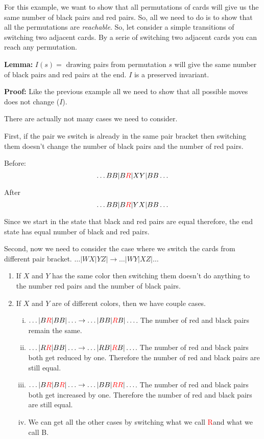 \documentclass[a4paper, 12pt]{article}
\renewcommand{\proof}{\vspace{0.5em}\noindent\textbf{Proof:} }
\newcommand{\lemma}{\vspace{1em}\noindent\textbf{Lemma:} }
\newcommand{\R}{\textcolor{red}{R}}
\theoremstyle{examplestyle}
\begin{document}
\begin{multicols}{2}
For this example, we want to show that all permutations of cards will give us the same number of black pairs and red pairs. So, all we need to do is to show that all the permutations are \emph{reachable}. So, let consider a simple transitions of switching two adjacent cards. By a serie of switching two adjacent cards you can reach any permutation.

\lemma $I(s) = $ drawing pairs from permutation $s$ will give the same number of black pairs and red pairs at the end. $I$ is a preserved invariant.

\proof Like the previous example all we need to show that all possible moves does not change ($I$).

There are actually not many cases we need to consider.

First, if the pair we switch is already in the same pair bracket then switching them doesn't change the number of black pairs and the number of red pairs. 

Before:
\[
	\ldots BB | B\R | XY| BB \ldots
\]

After
\[
\ldots BB | B\R | YX | BB \ldots
\]

Since we start in the state that black and red pairs are equal therefore, the end state has equal number of black and red pairs.\checkmark

Second, now we need to consider the case where we switch the cards from different pair bracket. $ \ldots | WX|Y Z| \to \ldots| WY|X Z|\ldots $
\begin{enumerate}
	\item If $X$ and $Y$ has the same color then switching them doesn't do anything to the number red pairs and the number of black pairs.\checkmark
	\item If $X$ and $Y$ are of different colors, then we have couple cases.
	
	\begin{enumerate}[i)]
		\item $\ldots|B \R | B B|\ldots \to \ldots|B B | \R B|\ldots $. The number of red and black pairs remain the same. \checkmark
		\item $\ldots|R \R | B B|\ldots \to \ldots|R B | \R B|\ldots $. The number of red and black pairs both get reduced by one. Therefore the number of red and black pairs are still equal.\checkmark
		\item $\ldots|B \R | B \R|\ldots \to \ldots|BB | \R \R|\ldots $. The number of red and black pairs both get increased by one. Therefore the number of red and black pairs are still equal.\checkmark
		\item We can get all the other cases by switching what we call \R \;and what we call B.
	\end{enumerate}
	

\end{enumerate}
\end{multicols}
\end{document}
